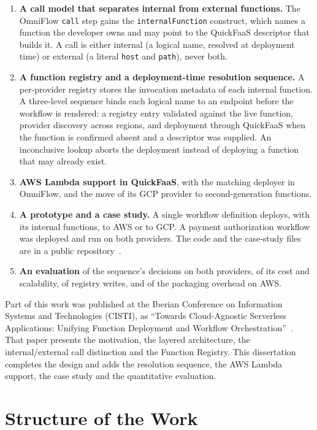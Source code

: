 \begin{enumerate}
	\item \textbf{A call model that separates internal from external functions.} The OmniFlow
	\texttt{call} step gains the \texttt{internalFunction} construct, which names a function the
	developer owns and may point to the QuickFaaS descriptor that builds it. A call is either
	internal (a logical name, resolved at deployment time) or external (a literal \texttt{host} and
	\texttt{path}), never both.
	\item \textbf{A function registry and a deployment-time resolution sequence.} A per-provider
	registry stores the invocation metadata of each internal function. A three-level sequence binds
	each logical name to an endpoint before the workflow is rendered: a registry entry validated
	against the live function, provider discovery across regions, and deployment through QuickFaaS
	when the function is confirmed absent and a descriptor was supplied. An inconclusive lookup
	aborts the deployment instead of deploying a function that may already exist.
	\item \textbf{AWS Lambda support in QuickFaaS}, with the matching deployer in OmniFlow, and the
	move of its GCP provider to second-generation functions.
	\item \textbf{A prototype and a case study.} A single workflow definition deploys, with its
	internal functions, to AWS or to GCP. A payment authorization workflow was deployed and
	run on both providers. The code and the case-study files are in a public
	repository~\cite{carvalho2026repository}.
	\item \textbf{An evaluation} of the sequence's decisions on both providers, of its cost and
	scalability, of registry writes, and of the packaging overhead on AWS.
\end{enumerate}

Part of this work was published at the Iberian Conference on Information Systems and Technologies
(CISTI), as ``Towards Cloud-Agnostic Serverless Applications: Unifying Function Deployment and
Workflow Orchestration''~\cite{carvalho2026towards}.
That paper presents the motivation, the layered architecture, the internal/external call
distinction and the Function Registry. This dissertation completes the design and adds the
resolution sequence, the AWS Lambda support, the case study and the quantitative evaluation.

\section{Structure of the Work}
\label{sec:int_structure}

